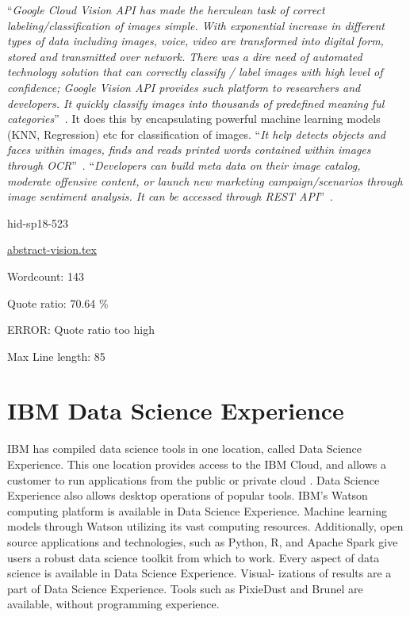 \color{blue}``\emph{Google Cloud Vision API has made the herculean task of correct 
labeling/classification of images simple. With exponential increase 
in different types of data including images, voice, video are 
transformed into digital form, stored and transmitted over network. 
There was a dire need of automated technology solution that can 
correctly classify / label images with high level of confidence; 
Google Vision API provides such platform to researchers and developers. 
It quickly classify images into thousands of predefined 
meaning ful categories}''\color{black}~\cite{hid-sp18-523-www-google-vision}. 
It does this by encapsulating powerful machine learning 
models (KNN, Regression) etc for classification of images. 
\color{blue}``\emph{It help detects objects and faces within images, finds and reads 
printed words contained within images through 
OCR}''\color{black}~\cite{hid-sp18-523-www-google-vision}. 
\color{blue}``\emph{Developers can build meta data on their image catalog, moderate 
offensive content, or launch new marketing campaign/scenarios through 
image sentiment analysis. It can be accessed 
through REST API}''\color{black}~\cite{hid-sp18-523-www-google-vision}.



\begin{IU}

hid-sp18-523

\href{https://github.com/cloudmesh-community/hid-sp18-523/blob/master//technology/abstract-vision.tex}{abstract-vision.tex}

 

Wordcount: 143


Quote ratio: 70.64 \%

ERROR: Quote ratio too high
 
Max Line length: 85
\end{IU}

\section{IBM Data Science Experience}

IBM has compiled data science tools in one location, 
called Data Science Experience. This one location provides
access to the IBM Cloud, and allows a customer to run 
applications from the public or private cloud 
\cite{hid-sp18-525-dsx}.
Data Science Experience also allows desktop operations 
of popular tools\cite{hid-sp18-525-dsx}.
IBM's Watson computing platform is available in Data Science
Experience. Machine learning models through Watson utilizing
its vast computing resources. Additionally, open source 
applications and technologies, such as Python, R, and Apache 
Spark give users a robust data science toolkit from which to
work\cite{hid-sp18-525-dsx}.
Every aspect of data science is available in Data Science 
Experience. Visual- izations of results are a part of Data 
Science Experience. Tools such as PixieDust and Brunel are 
available, without programming
experience\cite{hid-sp18-525-dsx}.



